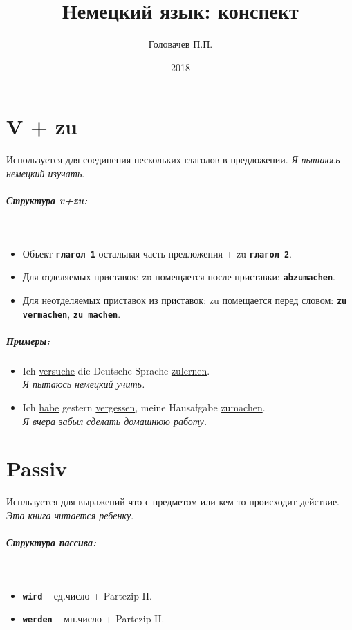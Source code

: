\documentclass[12pt]{report}
\title{Немецкий язык: конспект}
\date{2018}
\author{Головачев П.П.}
\newcommand{\term}[1]{\texttt{\textbf{#1}}}
\newcommand{\satzew}[1]{\underline{#1}}
\newcommand{\ubersatze}[1]{\textit{#1}}
\begin{document}
\tableofcontents


\newpage

\newpage

\chapter{V + zu}

Используется для соединения нескольких глаголов в предложении. \ubersatze{Я пытаюсь немецкий изучать}.

\paragraph{Структура v+zu:} ~\\
\begin{itemize}
\item Объект \term{глагол 1} остальная часть предложения + zu \term{глагол 2}.
\item Для отделяемых приставок: zu помещается после приставки: \term{abzumachen}.
\item Для неотделяемых приставок из приставок: zu помещается перед словом: \term{zu vermachen}, \term{zu machen}.
\end{itemize}

\paragraph{Примеры:}
\begin{itemize}
\item Ich \satzew{versuche} die Deutsche Sprache \satzew{zulernen}.
~\\ \ubersatze{Я пытаюсь немецкий учить.}
\item Ich \satzew{habe} gestern \satzew{vergessen}, meine Hausafgabe \satzew{zumachen}.
~\\ \ubersatze{Я вчера забыл сделать домашнюю работу.}
\end{itemize}

\chapter{Passiv}

Испльзуется для выражений что с предметом или кем-то происходит действие. \ubersatze{Эта книга читается ребенку}.

\paragraph{Структура пассива:} ~\\
\begin{itemize}
\item \term{wird} -- ед.число + Partezip II.
\item \term{werden} -- мн.число + Partezip II.
\end{itemize}
\end{document}

